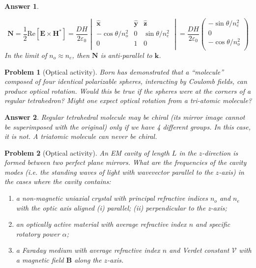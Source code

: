 \documentclass[a4paper]{article}
\newtheorem{ans}{Answer}[section]
\theoremstyle{new}
\newtheorem{qns}{Problem}[section]
\begin{document}
\begin{ans}
\begin{enumerate}[label=(\alph*)]
$$\mathbf{N}=\frac{1}{2}\text{Re}[\mathbf{E}\times\mathbf{H}^*]=\frac{DH}{2\varepsilon_0}\begin{vmatrix}\mathbf{\hat{x}}&\mathbf{\hat{y}}&\mathbf{\hat{z}}\\-\cos\theta/n_o^2&0&\sin\theta/n_e^2\\0&1&0\\\end{vmatrix}=\frac{DH}{2\varepsilon_0}\begin{pmatrix}-\sin\theta/n_e^2\\0\\-\cos\theta/n_o^2\\\end{pmatrix}$$
In the limit of $n_o\approx n_e$, then $\mathbf{N}$ is anti-parallel to $\mathbf{k}$.
\end{enumerate}
\end{ans}
\begin{qns}[Optical activity]
Born has demonstrated that a “molecule” composed of four identical polarizable spheres, interacting by Coulomb fields, can produce optical rotation. Would this be true if the spheres were at the corners of a regular tetrahedron? Might one expect optical rotation from a tri-atomic molecule?
\end{qns}
\begin{ans}
Regular tetrahedral molecule may be chiral (its mirror image cannot be superimposed with the original) only if we have 4 different groups. In this case, it is not. A triatomic molecule can never be chiral.
\end{ans}
\newpage
\begin{qns}[Optical activity]
An EM cavity of length $L$ in the $z$-direction is formed between two perfect plane mirrors. What are the frequencies of the cavity modes (i.e. the standing waves of light with wavevector parallel to the $z$-axis) in the cases where the cavity contains:
\begin{enumerate}[label=(\alph*)]
\item a non-magnetic uniaxial crystal with principal refractive indices $n_o$ and $n_e$ with the optic axis aligned (i) parallel; (ii) perpendicular to the z-axis;
\item an optically active material with average refractive index $n$ and specific rotatory power $\alpha$;
\item a Faraday medium with average refractive index $n$ and Verdet constant $\mathcal{V}$ with a magnetic field $\mathbf{B}$ along the $z$-axis.
\end{enumerate}
\end{qns}
\end{document}
